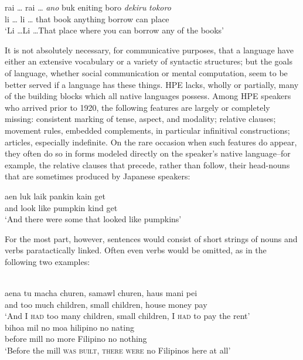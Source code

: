 
\ea\label{ex:13}
\gll rai \ldots {} rai \ldots {} \textit{ano} buk eniting boro \textit{dekiru} \textit{tokoro}\\
li \ldots {} li \ldots {} that book anything borrow can place\\
\glt `Li \ldots  Li \ldots  That place where you can borrow any of the books'
\z

It is not absolutely necessary, for communicative purposes, that a language have either an extensive vocabulary or a variety of syntactic structures; but the goals of language, whether social communication or mental computation, seem to be better served if a language has these things. HPE lacks, wholly or partially, many of the building blocks which all native languages possess. Among HPE speakers who arrived prior to 1920, the following features are largely or completely missing: consistent marking of tense, aspect, and modality; relative clauses; movement rules, embedded complements, in particular infinitival con\-structions; articles, especially indefinite. On the rare occasion when such features do appear, they often do so in forms modeled directly on the speaker's native language--for example, the relative clauses that precede, rather than follow, their head-nouns that are sometimes produced by Japanese speakers:

\ea\label{ex:14}
\gll aen luk laik pankin kain get\\
and look like pumpkin kind get \\
\glt  `And there were some that looked like pumpkins'
\z

For the most part, however, sentences would consist of short strings of nouns and verbs paratactically linked. Often even verbs would be omitted, as in the following two examples:

\ea\label{ex:15}
\\
\gll aena tu macha churen, samawl churen, haus mani pei\\
and too much children, small children, house money pay\\
\glt `And I \textsc{had} too many children, small children, I \textsc{had} to pay the rent'
\z
{}
\ea\label{ex:16}
\\
\gll bihoa mil no moa hilipino no nating\\
before mill no more Filipino no nothing\\ 
\glt  `Before the mill \textsc{was built, there were} no Filipinos here at all' 
\z

